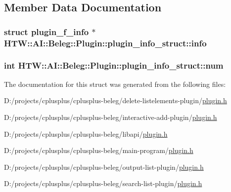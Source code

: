 \subsection{Member Data Documentation}
\hypertarget{struct_h_t_w_1_1_a_i_1_1_beleg_1_1_plugin_1_1plugin__info__struct_af68df9f007dbfe37342d58627472b927}{
\subsubsection[{info}]{\setlength{\rightskip}{0pt plus 5cm}struct {\bf plugin\-\_\-f\-\_\-info} $\ast$ H\-T\-W\-::\-A\-I\-::\-Beleg\-::\-Plugin\-::plugin\-\_\-info\-\_\-struct\-::info}}\label{struct_h_t_w_1_1_a_i_1_1_beleg_1_1_plugin_1_1plugin__info__struct_af68df9f007dbfe37342d58627472b927}
\hypertarget{struct_h_t_w_1_1_a_i_1_1_beleg_1_1_plugin_1_1plugin__info__struct_a90069f082490ef14f554e6ea9ceb367d}{
\subsubsection[{num}]{\setlength{\rightskip}{0pt plus 5cm}int H\-T\-W\-::\-A\-I\-::\-Beleg\-::\-Plugin\-::plugin\-\_\-info\-\_\-struct\-::num}}\label{struct_h_t_w_1_1_a_i_1_1_beleg_1_1_plugin_1_1plugin__info__struct_a90069f082490ef14f554e6ea9ceb367d}


The documentation for this struct was generated from the following files\-:\begin{DoxyCompactItemize}
\item 
D\-:/projects/cplusplus/cplusplus-\/beleg/delete-\/listelements-\/plugin/\hyperlink{delete-listelements-plugin_2plugin_8h}{plugin.\-h}\item 
D\-:/projects/cplusplus/cplusplus-\/beleg/interactive-\/add-\/plugin/\hyperlink{interactive-add-plugin_2plugin_8h}{plugin.\-h}\item 
D\-:/projects/cplusplus/cplusplus-\/beleg/libapi/\hyperlink{libapi_2plugin_8h}{plugin.\-h}\item 
D\-:/projects/cplusplus/cplusplus-\/beleg/main-\/program/\hyperlink{main-program_2plugin_8h}{plugin.\-h}\item 
D\-:/projects/cplusplus/cplusplus-\/beleg/output-\/list-\/plugin/\hyperlink{output-list-plugin_2plugin_8h}{plugin.\-h}\item 
D\-:/projects/cplusplus/cplusplus-\/beleg/search-\/list-\/plugin/\hyperlink{search-list-plugin_2plugin_8h}{plugin.\-h}\end{DoxyCompactItemize}
